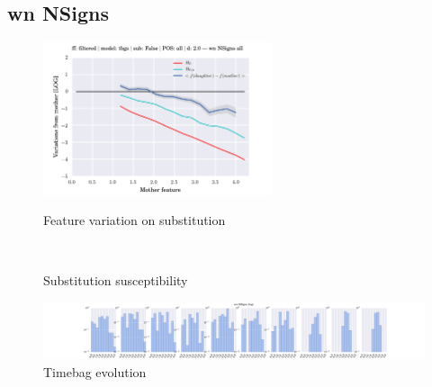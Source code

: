 \subsection{wn NSigns}
\begin{figure}[h!]
    \centering
    \includegraphics[width=0.6\textwidth]{images/feature-cards/wn_NSigns/feature_variations.png}
    \caption{Feature variation on substitution}
	~
	\caption{Substitution susceptibility}
    \includegraphics[width=\textwidth]{images/feature-cards/wn_NSigns/timebags_evolution-hist.png}
	\caption{Timebag evolution}
\end{figure}


\clearpage

